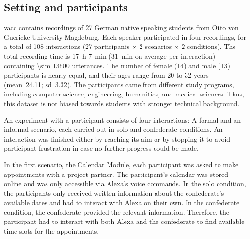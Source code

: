 
\subsection{Setting and participants}
\label{subsec:setting_and_participants}

\ac{vacc} contains recordings of 27 German native speaking students from Otto von Guericke University Magdeburg.
Each speaker participated in four recordings, for a total of 108 interactions (27 participants $\times$ 2 scenarios $\times$ 2 conditions).
The total recording time is \SI{17}{\hour} \SI{7}{\minute} (\SI{31}{\minute} on average per interaction) containing \num{\sim 13500} utterances.
The number of female (14) and male (13) participants is nearly equal, and their ages range from 20 to 32 years (mean~24.11; sd~3.32).
The participants came from different study programs, including computer science, engineering, humanities, and medical sciences.
Thus, this dataset is not biased towards students with stronger technical background.

An experiment with a participant consists of four interactions:
A formal and an informal scenario, each carried out in solo and confederate conditions.
An interaction was finished either by reaching its aim or by stopping it to avoid participant frustration in case no further progress could be made.

In the first scenario, the Calendar Module, each participant was asked to make appointments with a project partner.
The participant's calendar was stored online and was only accessible via Alexa's voice commands.
In the solo condition, the participants only received written information about the confederate's available dates and had to interact with Alexa on their own.
In the confederate condition, the confederate provided the relevant information.
Therefore, the participant had to interact with both Alexa and the confederate to find available time slots for the appointments.

